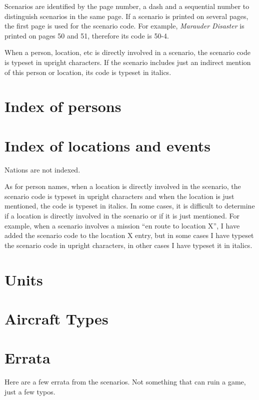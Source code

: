 \documentclass[a4paper,twocolumn]{article}
\begin{document}
Scenarios are identified by the page number, a dash and a
sequential number to distinguish scenarios in the same page. If
a scenario is printed on several pages, the first page is used for
the scenario code. For example, \textit{Marauder Disaster} is printed
on pages 50 and 51, therefore its code is 50-4.

When a person, location, etc is directly involved in a scenario,
the scenario code is typeset in upright characters. If the scenario
includes just an indirect mention of this person or location,
its code is typeset in italics.

\section*{Index of persons}

\vspace{3mm}


\section*{Index of locations and events}

Nations are not indexed.

\vspace{3mm}

As for person names, when a location is directly involved in the
scenario, the scenario code is typeset in upright characters and when
the location is just mentioned, the code is typeset in italics.
In some cases, it is difficult to determine if a location is directly
involved in the scenario or if it is just mentioned. For example, when
a scenario involves a mission ``en route to location X'', I have
added the scenario code to the location X entry, but in some cases I have
typeset the scenario code in upright characters, in other cases I have
typeset it in italics.

\vspace{3mm}


\section*{Units}

\vspace{3mm}


\section*{Aircraft Types}

\vspace{3mm}


\section*{Errata}

Here are a few errata from the scenarios. Not something that can ruin a game, just
a few typos.

\vspace{3mm}

\end{document}
